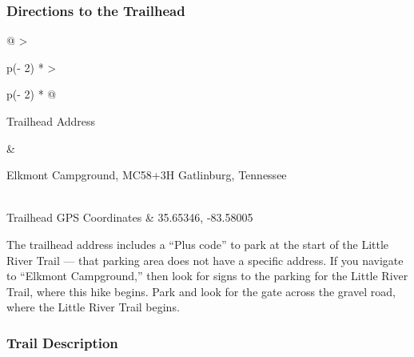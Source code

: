 \documentclass[
  letterpaper,
  DIV=11,
  numbers=noendperiod]{scrartcl}
\begin{document}
\hypertarget{directions-to-the-trailhead-20}{%
\subsubsection{Directions to the
Trailhead}\label{directions-to-the-trailhead-20}}

\begin{longtable}[]{@{}
  >{\raggedright\arraybackslash}p{(\columnwidth - 2\tabcolsep) * }
  >{\raggedright\arraybackslash}p{(\columnwidth - 2\tabcolsep) * }@{}}
\toprule\noalign{}
\begin{minipage}[b]{\linewidth}\raggedright
Trailhead Address
\end{minipage} & \begin{minipage}[b]{\linewidth}\raggedright
Elkmont Campground, MC58+3H Gatlinburg, Tennessee
\end{minipage} \\
\midrule\noalign{}
\endhead
\bottomrule\noalign{}
\endlastfoot
Trailhead GPS Coordinates & 35.65346, -83.58005 \\
\end{longtable}

The trailhead address includes a ``Plus code'' to park at the start of
the Little River Trail --- that parking area does not have a specific
address. If you navigate to ``Elkmont Campground,'' then look for signs
to the parking for the Little River Trail, where this hike begins. Park
and look for the gate across the gravel road, where the Little River
Trail begins.

\hypertarget{trail-description-20}{%
\subsubsection{Trail Description}\label{trail-description-20}}
\end{document}
